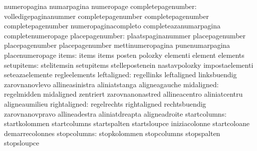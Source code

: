                                  numeropagina                     numarpagina
                                  numeropage
              completepagenumber: volledigepaginanummer            completepagenumber
                                  completepagenumber               completepagenumber %
                                  numeropaginacompleto             completeazanumarpagina %
                                  completenumeropage
                 placepagenumber: plaatspaginanummer               placepagenumber
                                  placepagenumber                  placepagenumber %
                                  mettinumeropagina                punenumarpagina %
                                  placenumeropage
                           items: items                            items
                                  posten                           polozky
                                  elementi                         element
                                  elements
                      setupitems: stelitemsin                      setupitems
                                  stellepostenein                  nastavpolozky
                                  impostaelementi                  seteazaelemente
                                  regleelements
                     leftaligned: regellinks                       leftaligned
                                  linksbuendig                     zarovnanovlevo
                                  allineasinistra                  aliniatstanga
                                  aligneagauche
                      midaligned: regelmidden                      midaligned
                                  zentriert                        zarovnanonastred
                                  allineacentro                    aliniatcentru
                                  aligneaumilieu
                    rightaligned: regelrechts                      rightaligned
                                  rechtsbuendig                    zarovnanovpravo
                                  allineadestra                    aliniatdreapta
                                  aligneadroite
                    startcolumns: startkolommen                    startcolumns
                                  startspalten                     startsloupce
                                  iniziacolonne                    startcoloane
                                  demarrecolonnes
                     stopcolumns: stopkolommen                     stopcolumns
                                  stopspalten                      stopsloupce
